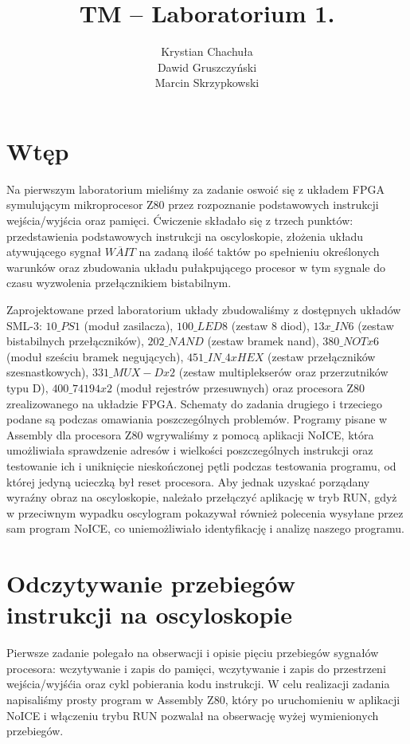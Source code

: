 \documentclass[fleqn]{article}
\title{TM -- Laboratorium 1.}
\author{Krystian Chachuła \\ Dawid Gruszczyński \\ Marcin Skrzypkowski}
\begin{document}
\maketitle

\setcounter{page}{0}
\thispagestyle{empty}

\pagebreak

\setcounter{page}{1}

\section{Wtęp}

Na pierwszym laboratorium mieliśmy za zadanie oswoić się z układem FPGA symulującym mikroprocesor Z80 przez rozpoznanie podstawowych instrukcji wejścia/wyjścia oraz pamięci. Ćwiczenie składało się z trzech punktów: przedstawienia podstawowych instrukcji na oscyloskopie, złożenia układu atywującego sygnał $\overline{WAIT}$ na zadaną ilość taktów po spełnieniu określonych warunków oraz zbudowania układu pułakpującego procesor w tym sygnale do czasu wyzwolenia przełącznikiem bistabilnym.

Zaprojektowane przed laboratorium układy zbudowaliśmy z dostępnych układów SML-3: ${10\_PS1}$ (moduł zasilacza), ${100\_LED8}$ (zestaw 8 diod), ${13x\_IN6}$ (zestaw bistabilnych przełączników), ${202\_NAND}$ (zestaw bramek nand), ${380\_NOTx6}$ (moduł sześciu bramek negujących), ${451\_IN\_4xHEX}$ (zestaw przełączników szesnastkowych), ${331\_MUX-Dx2}$ (zestaw multiplekserów oraz przerzutników typu D), ${400\_74194x2}$ (moduł rejestrów przesuwnych) oraz procesora Z80 zrealizowanego na układzie FPGA. Schematy do zadania drugiego i trzeciego podane są podczas omawiania poszczególnych problemów. Programy pisane w Assembly dla procesora Z80 wgrywaliśmy z pomocą aplikacji NoICE, która umożliwiała sprawdzenie adresów i wielkości poszczególnych instrukcji oraz testowanie ich i uniknięcie nieskończonej pętli podczas testowania programu, od której jedyną ucieczką był reset procesora. Aby jednak uzyskać porządany wyraźny obraz na oscyloskopie, należało przełączyć aplikację w tryb RUN, gdyż w przeciwnym wypadku oscylogram pokazywał również polecenia wysyłane przez sam program NoICE, co uniemożliwiało identyfikację i analizę naszego programu.



\section{Odczytywanie przebiegów instrukcji na oscyloskopie}
Pierwsze zadanie polegało na obserwacji i opisie pięciu przebiegów sygnałów procesora: wczytywanie i zapis do pamięci, wczytywanie i zapis do przestrzeni wejścia/wyjśćia oraz cykl pobierania kodu instrukcji.
W celu realizacji zadania napisaliśmy prosty program w Assembly Z80, który po uruchomieniu w aplikacji NoICE i włączeniu trybu RUN pozwalał na obserwację wyżej wymienionych przebiegów.
\end{document}
